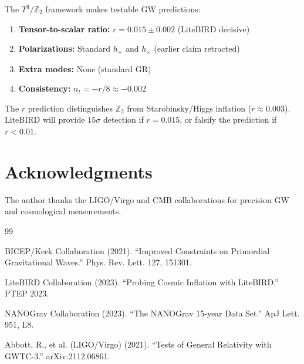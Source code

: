 \documentclass[12pt,a4paper]{article}
\begin{document}
The $T^3/\mathbb{Z}_2$ framework makes testable GW predictions:

\begin{enumerate}
    \item \textbf{Tensor-to-scalar ratio:} $r = 0.015 \pm 0.002$ (LiteBIRD decisive)
    \item \textbf{Polarizations:} Standard $h_+$ and $h_\times$ (earlier claim retracted)
    \item \textbf{Extra modes:} None (standard GR)
    \item \textbf{Consistency:} $n_t = -r/8 \approx -0.002$
\end{enumerate}

The $r$ prediction distinguishes $\mathbb{Z}_2$ from Starobinsky/Higgs inflation ($r \approx 0.003$). LiteBIRD will provide $15\sigma$ detection if $r = 0.015$, or falsify the prediction if $r < 0.01$.

\section*{Acknowledgments}

The author thanks the LIGO/Virgo and CMB collaborations for precision GW and cosmological measurements.

\begin{thebibliography}{99}

BICEP/Keck Collaboration (2021). ``Improved Constraints on Primordial Gravitational Waves.'' Phys. Rev. Lett. 127, 151301.

LiteBIRD Collaboration (2023). ``Probing Cosmic Inflation with LiteBIRD.'' PTEP 2023.

NANOGrav Collaboration (2023). ``The NANOGrav 15-year Data Set.'' ApJ Lett. 951, L8.

Abbott, R., et al. (LIGO/Virgo) (2021). ``Tests of General Relativity with GWTC-3.'' arXiv:2112.06861.

\end{thebibliography}
\end{document}
